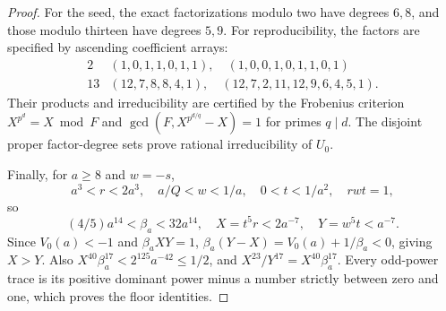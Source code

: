 \documentclass[11pt,a4paper]{article}
\theoremstyle{remark}\newtheorem{remark}[theorem]{Remark}
\begin{document}
\begin{proof}
For the seed, the exact factorizations modulo two have degrees $6,8$,
and those modulo thirteen have degrees $5,9$. For reproducibility,
the factors are specified by ascending coefficient arrays:
\[
\begin{array}{c|l}
2&(1,0,1,1,0,1,1),\quad(1,0,0,1,0,1,1,0,1)\\
13&(12,7,8,8,4,1),\quad(12,7,2,11,12,9,6,4,5,1).
\end{array}
\]
Their products and irreducibility are certified by the Frobenius
criterion $X^{p^d}=X\bmod F$ and
$\gcd(F,X^{p^{d/q}}-X)=1$ for primes $q\mid d$. The disjoint proper
factor-degree sets prove rational irreducibility of $U_0$.

Finally, for $a\ge8$ and $w=-s$,
\[
 a^3<r<2a^3,\quad a/Q<w<1/a,\quad 0<t<1/a^2,
 \quad rwt=1,
\]
so
\[
 (4/5)a^{14}<\beta_a<32a^{14},\quad
 X=t^5r<2a^{-7},\quad Y=w^5t<a^{-7}.
\]
Since $V_0(a)<-1$ and $\beta_aXY=1$,
$\beta_a(Y-X)=V_0(a)+1/\beta_a<0$, giving $X>Y$.
Also $X^{40}\beta_a^{17}<2^{125}a^{-42}\le1/2$, and
$X^{23}/Y^{17}=X^{40}\beta_a^{17}$. Every odd-power trace is its
positive dominant power minus a number strictly between zero and one,
which proves the floor identities.
\end{proof}
\end{document}
